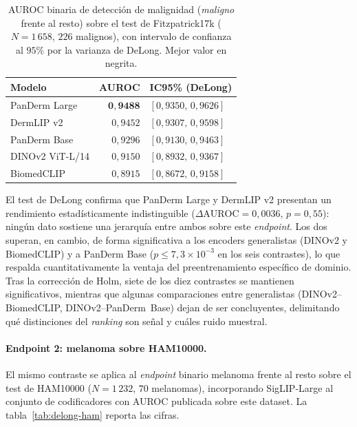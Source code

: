 \begin{table}[htbp]
\centering
\footnotesize
\setlength{\tabcolsep}{4pt}
\renewcommand{\arraystretch}{0.95}
\caption{AUROC binaria de detección de malignidad (\emph{maligno}
frente al resto) sobre el test de Fitzpatrick17k
($N = 1\,658$, $226$ malignos), con intervalo de confianza al
$95\%$ por la varianza de DeLong. Mejor valor en negrita.}
\label{tab:delong-auroc}
\begin{tabular}{lrl}
\hline
Modelo            & AUROC               & IC95\% (DeLong) \\
\hline
PanDerm Large     & $\mathbf{0{,}9488}$ & $[0{,}9350,\, 0{,}9626]$ \\
DermLIP v2        & $0{,}9452$          & $[0{,}9307,\, 0{,}9598]$ \\
PanDerm Base      & $0{,}9296$          & $[0{,}9130,\, 0{,}9463]$ \\
DINOv2 ViT-L/14   & $0{,}9150$          & $[0{,}8932,\, 0{,}9367]$ \\
BiomedCLIP        & $0{,}8915$          & $[0{,}8672,\, 0{,}9158]$ \\
\hline
\end{tabular}
\end{table}

El test de DeLong confirma que PanDerm Large y DermLIP v2 presentan un
rendimiento estadísticamente indistinguible
($\Delta\mathrm{AUROC} = 0{,}0036$, $p = 0{,}55$): ningún dato sostiene
una jerarquía entre ambos sobre este \emph{endpoint}. Los dos superan,
en cambio, de forma significativa a los encoders generalistas (DINOv2
y BiomedCLIP) y a PanDerm Base ($p \leq 7{,}3\times 10^{-3}$ en los
seis contrastes), lo que respalda cuantitativamente la ventaja del
preentrenamiento específico de dominio. Tras la corrección de Holm,
siete de los diez contrastes se mantienen significativos, mientras que
algunas comparaciones entre generalistas (DINOv2--BiomedCLIP,
DINOv2--PanDerm~Base) dejan de ser concluyentes, delimitando qué
distinciones del \emph{ranking} son señal y cuáles ruido muestral.

\paragraph{Endpoint 2: melanoma sobre HAM10000.}
El mismo contraste se aplica al \emph{endpoint} binario melanoma frente
al resto sobre el test de HAM10000 ($N = 1\,232$, $70$ melanomas),
incorporando SigLIP-Large al conjunto de codificadores con AUROC
publicada sobre este dataset. La tabla~\ref{tab:delong-ham} reporta las
cifras.

